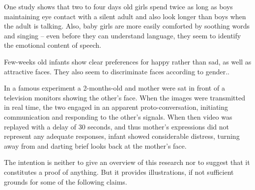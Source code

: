 \begin{enumerate}
  One study shows that two to four days old girls spend twice as long as boys
  maintaining eye contact with a silent adult and also look longer than boys
  when the adult is talking. Also, baby girls are more easily comforted by
  soothing words and singing -- even before they can understand language, they
  seem to identify the emotional content of
  speech.
  
  Few-weeks old infants show clear preferences for happy rather than sad, as
  well as attractive faces. They also seem to discriminate faces
  according to gender..
  
  In a famous experiment a 2-months-old and
  mother were sat in front of a television monitors showing the other's face.
  When the images were transmitted in real time, the two engaged in an apparent
  proto-conversation, initiating communication and responding to the other's
  signals. When then video was replayed with a delay of 30 seconds, and thus
  mother's expressions did not represent any adequate responses, infant showed
  considerable distress, turning away from and darting brief looks back at the
  mother's face.
\end{enumerate}
 
The intention is neither to give an overview of this research nor to suggest
that it constitutes a proof of anything.   But it provides illustrations, if not sufficient grounds
for some of the following claims.
 
